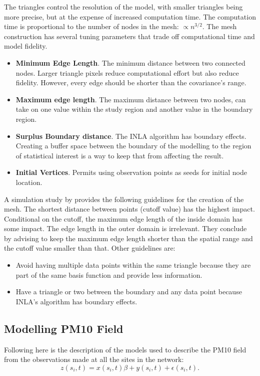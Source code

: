 The triangles control the resolution of the model, with smaller triangles being more precise, but at the expense of increased computation time.  The computation time is proportional to the number of nodes in the mesh: $\propto n^{3/2}$.  The mesh construction has several tuning parameters that trade off computational time and model fidelity.

\begin{itemize}
	\item \textbf{Minimum Edge Length}.  The minimum distance between two connected nodes. Larger triangle pixels reduce computational effort but also reduce fidelity.  However, every edge should be shorter than the covariance's range.
	\item \textbf{Maximum edge length}.  The maximum distance between two nodes, can take on one value within the study region and another value in the boundary region. 
	\item \textbf{Surplus Boundary distance}.  The \ac{INLA} algorithm has boundary effects.  Creating a buffer space between the boundary of the modelling to the region of statistical interest is a way to keep that from affecting the result.
	\item \textbf{Initial Vertices}. Permits using observation points as seeds for initial node location.
\end{itemize}

A simulation study by \citet{Righetto2020} provides the following guidelines for the creation of the mesh.  The shortest distance between points (cutoff value) has the highest impact.  Conditional on the cutoff, the maximum edge length of the inside domain has some impact.  The edge length in the outer domain is irrelevant.  They conclude by advising to keep the maximum edge length shorter than the spatial range and the cutoff value smaller than that.  Other guidelines are:
\begin{itemize}
	\item Avoid having multiple data points within the same triangle because they are part of the same basis function and provide less information.
	\item Have a triangle or two between the boundary and any data point because \ac{INLA}'s algorithm has boundary effects.
\end{itemize} 






\subsection{Modelling PM10 Field}\label{subsec:modelling PM10}
Following \cite{cameletti2011spatio} here is the description of the models used to describe the \ac{PM10} field from the observations made at all the sites in the network:
\begin{equation} \label{eq:obs_y}
	z(s_i,t) = x(s_i,t)\beta + y(s_i, t) + \epsilon(s_i,t).
\end{equation}

